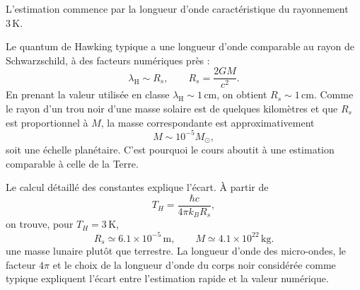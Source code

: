 L’estimation commence par la longueur d’onde caractéristique du rayonnement \(3\,\mathrm{K}\).

\begin{classroomqa}
\end{classroomqa}

Le quantum de Hawking typique a une longueur d’onde comparable au rayon de Schwarzschild, à des facteurs numériques près :
\begin{equation}
\lambda_{\mathrm{H}}\sim R_s,
\qquad
R_s=\frac{2GM}{c^2}.
\label{eq:l05-scale}
\end{equation}
En prenant la valeur utilisée en classe \(\lambda_{\mathrm H}\sim1\,\mathrm{cm}\), on obtient \(R_s\sim1\,\mathrm{cm}\). Comme le rayon d’un trou noir d’une masse solaire est de quelques kilomètres et que \(R_s\) est proportionnel à \(M\), la masse correspondante est approximativement
\begin{equation}
M\sim10^{-5}M_\odot,
\label{eq:l05-rough-mass}
\end{equation}
soit une échelle planétaire. C’est pourquoi le cours aboutit à une estimation comparable à celle de la Terre.

\begin{classroomqa}
\end{classroomqa}

Le calcul détaillé des constantes explique l’écart. À partir de
\begin{equation}
T_H=\frac{\hbar c}{4\pi k_B R_s},
\end{equation}
on trouve, pour \(T_H=3\,\mathrm{K}\),
\begin{equation}
R_s\simeq6.1\times10^{-5}\,\mathrm{m},
\qquad
M\simeq4.1\times10^{22}\,\mathrm{kg}.
\label{eq:l05-three-kelvin}
\end{equation}
une masse lunaire plutôt que terrestre. La longueur d’onde des micro-ondes, le facteur \(4\pi\) et le choix de la longueur d’onde du corps noir considérée comme typique expliquent l’écart entre l’estimation rapide et la valeur numérique.

